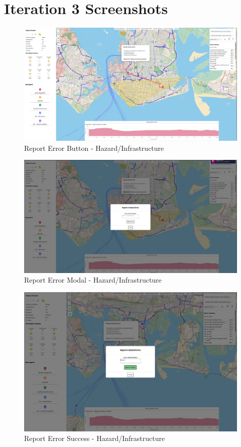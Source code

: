 \chapter{Iteration 3 Screenshots}

\begin{figure}[!ht]
    \centering
    \includegraphics[width=425px]{figures/Progress Images/Iteration-3/SR39/Sr39-report-error-btn.png}
    \caption{Report Error Button - Hazard/Infrastructure}
    \label{fig:hazard-report-error}
\end{figure}

\begin{figure}[!ht]
    \centering
    \includegraphics[width=425px]{figures/Progress Images/Iteration-3/SR39/Sr39-report-error-modal.png}
    \caption{Report Error Modal - Hazard/Infrastructure}
    \label{fig:hazard-report-error-modal}
\end{figure}

\begin{figure}[!ht]
    \centering
    \includegraphics[width=425px]{figures/Progress Images/Iteration-3/SR39/Sr39-report-error-success.png}
    \caption{Report Error Success - Hazard/Infrastructure}
    \label{fig:hazard-report-error-success}
\end{figure}

